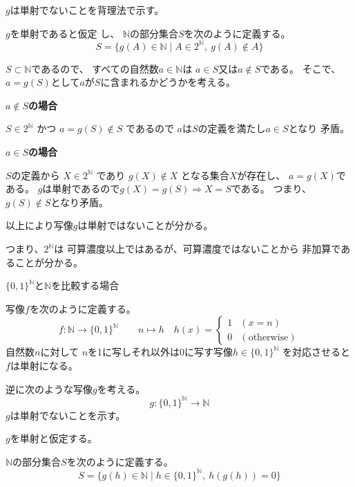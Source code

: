 \documentclass[12pt,b5paper]{ltjsarticle}
\begin{document}
$g$は単射でないことを背理法で示す。

$g$を単射であると仮定
し、
$\mathbb{N}$の部分集合$S$を次のように定義する。
\begin{equation}
 S = \{
  g(A)\in\mathbb{N} \mid A\in 2^{\mathbb{N}},\ g(A)\not\in A
  \}
\end{equation}

$S\subset \mathbb{N}$であるので、
すべての自然数$a\in\mathbb{N}$は
$a\in S$又は$a\not\in S$である。
そこで、$a=g(S)$として$a$が$S$に含まれるかどうかを考える。



\textbf{$a\not\in S$の場合}

$S\in 2^{\mathbb{N}}$ かつ $a=g(S)\not\in S$
であるので
$a$は$S$の定義を満たし$a\in S$となり
矛盾。


\textbf{$a\in S$の場合}

$S$の定義から
$X\in 2^{\mathbb{N}}$
であり
$g(X)\not\in X$
となる集合$X$が存在し、
$a=g(X)$である。
$g$は単射であるので$g(X)=g(S) \Rightarrow X=S$である。
つまり、$g(S)\not\in S$となり矛盾。


以上により写像$g$は単射ではないことが分かる。

つまり、$2^{\mathbb{N}}$は
可算濃度以上ではあるが、可算濃度ではないことから
非加算であることが分かる。




\dotfill
$\{0,1\}^{\mathbb{N}}$と$\mathbb{N}$を比較する場合
\dotfill

写像$f$を次のように定義する。
\begin{equation}
 f:
 \mathbb{N}
  \rightarrow
  \{0,1\}^{\mathbb{N}}
  \qquad
  n \mapsto h
  \quad
  h(x)=
  \begin{cases}
   1 & (x=n)\\
   0 & (\text{otherwise})
  \end{cases}
\end{equation}
自然数$n$に対して
$n$を1に写しそれ以外は0に写す写像$h\in\{0,1\}^{\mathbb{N}}$
を対応させると
$f$は単射になる。

逆に次のような写像$g$を考える。
\begin{equation}
 g:
  \{0,1\}^{\mathbb{N}}
  \rightarrow
   \mathbb{N}
\end{equation}
$g$は単射でないことを示す。

$g$を単射と仮定する。

$\mathbb{N}$の部分集合$S$を次のように定義する。
\begin{equation}
 S=\{g(h)\in\mathbb{N} \mid h\in\{0,1\}^{\mathbb{N}} ,\ h(g(h))=0\}
\end{equation}
\end{document}
